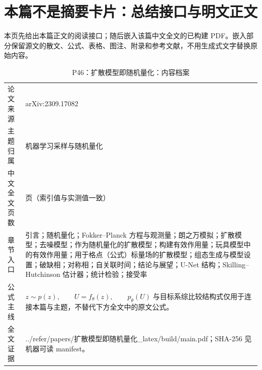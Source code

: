 \documentclass[UTF8,11pt,oneside]{ctexbook}
\begin{document}
\section*{本篇不是摘要卡片：总结接口与明文正文}
本页先给出本篇正文的阅读接口；随后嵌入该篇中文全文的已构建 PDF。嵌入部分保留源文的散文、公式、表格、图注、附录和参考文献，不用生成式文字替换原始内容。
\begin{table}[htbp]
  \centering
  \caption{P46：扩散模型即随机量化：内容档案}
  \small
  \begin{tabularx}{0.96\textwidth}{@{}p{3.3cm}>{\raggedright\arraybackslash}X@{}}
    \toprule
    论文来源 & arXiv:2309.17082 \\
    主题归属 & 机器学习采样与随机量化 \\
    中文全文页数 & 23 页（索引值与实测值一致） \\
    章节入口 & 引言；随机量化；Fokker–Planck 方程与观测量；朗之万模拟；扩散模型；去噪模型；作为随机量化的扩散模型；构建有效作用量；玩具模型中的有效作用量；用于格点（公式）标量场的扩散模型；组态生成与模型设置；破缺相；对称相；自关联时间；结论与展望；U-Net 结构；Skilling–Hutchinson 估计器；统计检验；接受率 \\
    公式主线 & $z\sim p(z),\qquad U=f_\theta(z),\qquad p_\theta(U)\;\text{与目标系综比较}$\newline\scriptsize 结构式仅用于连接本篇与主题，不替代下方全文中的原文公式。 \\
    全文证据 & ../\allowbreak{}refer/\allowbreak{}papers/\allowbreak{}扩散模型即随机量化\_\allowbreak{}latex/\allowbreak{}build/\allowbreak{}main.pdf；SHA-256 见机器可读 manifest。 \\
    \bottomrule
  \end{tabularx}
\end{table}
\end{document}
